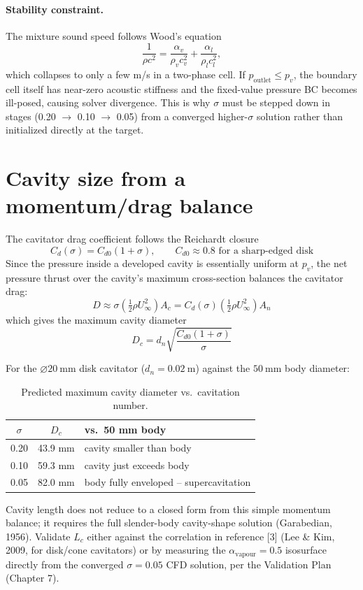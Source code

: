 \paragraph{Stability constraint.} The mixture sound speed follows Wood's
equation
\begin{equation}
    \frac{1}{\rho c^2} = \frac{\alpha_v}{\rho_v c_v^2} + \frac{\alpha_l}{\rho_l c_l^2},
\end{equation}
which collapses to only a few m/s in a two-phase cell. If $p_{\text{outlet}}
\le p_v$, the boundary cell itself has near-zero acoustic stiffness and the
fixed-value pressure BC becomes ill-posed, causing solver divergence. This is
why $\sigma$ must be stepped down in stages (0.20 $\to$ 0.10 $\to$ 0.05) from a
converged higher-$\sigma$ solution rather than initialized directly at the
target.

\section{Cavity size from a momentum/drag balance}

The cavitator drag coefficient follows the Reichardt closure
\begin{equation}
    C_d(\sigma) = C_{d0}(1+\sigma), \qquad C_{d0} \approx 0.8 \text{ for a sharp-edged disk}
\end{equation}
Since the pressure inside a developed cavity is essentially uniform at $p_v$,
the net pressure thrust over the cavity's maximum cross-section balances the
cavitator drag:
\begin{equation}
    D \approx \sigma \left(\tfrac12 \rho U_\infty^2\right) A_c
    = C_d(\sigma)\left(\tfrac12 \rho U_\infty^2\right) A_n
\end{equation}
which gives the maximum cavity diameter
\begin{equation}
    \boxed{D_c = d_n \sqrt{\frac{C_{d0}(1+\sigma)}{\sigma}}}
\end{equation}

For the $\varnothing 20\ \text{mm}$ disk cavitator ($d_n = 0.02\ \text{m}$)
against the $50\ \text{mm}$ body diameter:

\begin{table}[h]
\centering
\begin{tabular}{ccl}
\toprule
$\sigma$ & $D_c$ & vs.\ 50 mm body \\
\midrule
0.20 & 43.9 mm & cavity smaller than body \\
0.10 & 59.3 mm & cavity just exceeds body \\
0.05 & 82.0 mm & body fully enveloped -- supercavitation \\
\bottomrule
\end{tabular}
\caption{Predicted maximum cavity diameter vs.\ cavitation number.}
\end{table}

Cavity length does not reduce to a closed form from this simple momentum
balance; it requires the full slender-body cavity-shape solution (Garabedian,
1956). Validate $L_c$ either against the correlation in reference [3]
(Lee \& Kim, 2009, for disk/cone cavitators) or by measuring the
$\alpha_{\text{vapour}} = 0.5$ isosurface directly from the converged
$\sigma = 0.05$ CFD solution, per the Validation Plan (Chapter 7).

